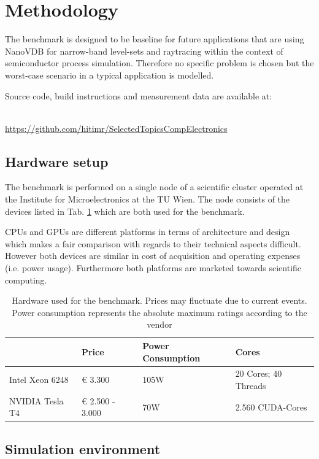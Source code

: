 \section{Methodology}
\label{sec:methodology}

The benchmark is designed to be baseline for future applications that are using NanoVDB for narrow-band level-sets and raytracing within the context of semiconductor process simulation.
Therefore no specific problem is chosen but the worst-case scenario in a typical application is modelled.

Source code, build instructions and measurement data are available at:
\\~\\
\centerline{\url{https://github.com/hitimr/SelectedTopicsCompElectronics}}


\subsection{Hardware setup}
The benchmark is performed on a single node of a scientific cluster operated at the Institute for Microelectronics at the TU Wien.
The node consists of the devices listed in Tab. \ref{tab:hardware} which are both used for the benchmark.

CPUs and GPUs are different platforms in terms of architecture and design which makes a fair comparison with regards to their technical aspects difficult.
However both devices are similar in cost of acquisition and operating expenses (i.e. power usage).
Furthermore both platforms are marketed towards scientific computing.


\begin{table}[H]
	\caption{Hardware used for the benchmark. Prices may fluctuate due to current events. Power consumption represents the absolute maximum ratings according to the vendor}
	\centering
	\begin{tabular}{@{}llll@{}}
		\toprule
		                & Price           & Power Consumption & Cores                \\ \hline
		Intel Xeon 6248 & € 3.300         & 105W              & 20 Cores; 40 Threads \\
		NVIDIA Tesla T4 & € 2.500 - 3.000 & 70W               & 2.560 CUDA-Cores     \\ \bottomrule
	\end{tabular}
	\label{tab:hardware}
\end{table}


\subsection{Simulation environment}

